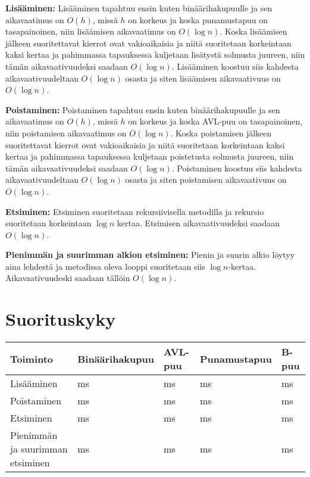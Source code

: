 \documentclass[12pt,a4paper,leqno,titlepage,twoside]{article}
\begin{document}
\begin{description}
\item{\textbf{Lisääminen:}} Lisääminen tapahtuu ensin kuten binäärihakupuulle
ja sen aikavaatimus on $O(h)$, missä $h$ on korkeus ja koska punamustapuu on tasapainoinen,
niin lisäämisen aikavaatimus on $O(\log n)$. Koska lisäämisen jälkeen suoritettavat
kierrot ovat vakioaikaisia ja niitä suoritetaan korkeintaan kaksi kertaa ja pahimmassa
tapauksessa kuljetaan lisätystä solmusta juureen, niin tämän aikavaativuudeksi
saadaan $O(\log n)$. Lisääminen koostuu siis kahdesta aikavaativuudeltaan $O(\log n)$
osasta ja siten lisäämisen aikavaativuus on $O(\log n)$.

\item{\textbf{Poistaminen:}} Poistaminen tapahtuu ensin kuten binäärihakupuulle
ja sen aikavaatimus on $O(h)$, missä $h$ on korkeus ja koska AVL-puu on tasapainoinen,
niin poistamisen aikavaatimus on $O(\log n)$. Koska poistamisen jälkeen suoritettavat
kierrot ovat vakioaikaisia ja niitä suoritetaan korkeintaan kaksi kertaa ja pahimmassa
tapauksessa kuljetaan poistetusta solmusta juureen, niin tämän aikavaativuudeksi
saadaan $O(\log n)$. Poistaminen koostuu siis kahdesta aikavaativuudeltaan $O(\log n)$
osasta ja siten poistamisen aikavaativuus on $O(\log n)$.

\item{\textbf{Etsiminen:}} Etsiminen suoritetaan rekursiivisella metodilla ja
rekursio suoritetaan korkeintaan $\log n$ kertaa. Etsimisen aikavaativuudeksi
saadaan $O(\log n)$.

\item{\textbf{Pienimmän ja suurimman alkion etsiminen:}} Pienin ja suurin alkio
löytyy aina lehdestä ja metodissa oleva looppi suoritetaan siis $\log n$-kertaa.
Aikavaativuudeski saadaan tällöin $O(\log n)$.
\end{description}

\section*{Suorituskyky}

\begin{table}
\begin{tabular}{|p{}|p{}|p{}|p{}|p{}|}
  \hline
  Toiminto & Bi\-nää\-ri\-ha\-ku\-puu & AVL-puu & Pu\-na\-mus\-ta\-puu & B-puu \\
  \hline
  \hline
  Lisääminen & ms & ms & ms & ms \\
  Poistaminen & ms & ms & ms & ms \\
  Etsiminen & ms & ms & ms & ms \\
  Pienimmän ja suurimman etsiminen & ms & ms & ms & ms \\
  \hline
\end{tabular}
\end{table}
\end{document}
